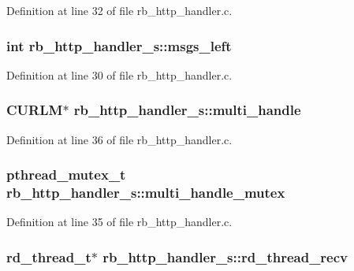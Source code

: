 Definition at line 32 of file rb\-\_\-http\-\_\-handler.\-c.

\hypertarget{structrb__http__handler__s_a803db851c00a617f8a80f00f29d9dba3}{
\subsubsection[{msgs\-\_\-left}]{\setlength{\rightskip}{0pt plus 5cm}int rb\-\_\-http\-\_\-handler\-\_\-s\-::msgs\-\_\-left}}\label{structrb__http__handler__s_a803db851c00a617f8a80f00f29d9dba3}


Definition at line 30 of file rb\-\_\-http\-\_\-handler.\-c.

\hypertarget{structrb__http__handler__s_a45c0ce1f2e4d154d0194bb60569c0faf}{
\subsubsection[{multi\-\_\-handle}]{\setlength{\rightskip}{0pt plus 5cm}C\-U\-R\-L\-M$\ast$ rb\-\_\-http\-\_\-handler\-\_\-s\-::multi\-\_\-handle}}\label{structrb__http__handler__s_a45c0ce1f2e4d154d0194bb60569c0faf}


Definition at line 36 of file rb\-\_\-http\-\_\-handler.\-c.

\hypertarget{structrb__http__handler__s_add4e2b7495e2f20396c2e70ab1a27bf4}{
\subsubsection[{multi\-\_\-handle\-\_\-mutex}]{\setlength{\rightskip}{0pt plus 5cm}pthread\-\_\-mutex\-\_\-t rb\-\_\-http\-\_\-handler\-\_\-s\-::multi\-\_\-handle\-\_\-mutex}}\label{structrb__http__handler__s_add4e2b7495e2f20396c2e70ab1a27bf4}


Definition at line 35 of file rb\-\_\-http\-\_\-handler.\-c.

\hypertarget{structrb__http__handler__s_ac22f049e3d329afb6b7b3eea9310fae8}{
\subsubsection[{rd\-\_\-thread\-\_\-recv}]{\setlength{\rightskip}{0pt plus 5cm}rd\-\_\-thread\-\_\-t$\ast$ rb\-\_\-http\-\_\-handler\-\_\-s\-::rd\-\_\-thread\-\_\-recv}}\label{structrb__http__handler__s_ac22f049e3d329afb6b7b3eea9310fae8}



